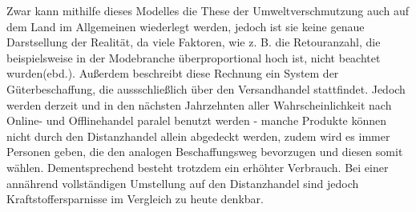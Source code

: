 \begin{folding}
\begin{itemize}
\end{itemize}
Zwar kann mithilfe dieses Modelles die These der Umweltverschmutzung auch auf dem Land im Allgemeinen wiederlegt werden, jedoch ist sie keine genaue Darstsellung der Realität, da viele Faktoren, wie z. B. die Retouranzahl, die beispielsweise in der Modebranche überproportional hoch ist, nicht beachtet wurden(ebd.). Außerdem beschreibt diese Rechnung ein System der Güterbeschaffung, die aussschließlich über den Versandhandel stattfindet. Jedoch werden derzeit und in den nächsten Jahrzehnten aller Wahrscheinlichkeit nach Online- und Offlinehandel paralel benutzt werden - manche Produkte können nicht durch den Distanzhandel allein abgedeckt werden, zudem wird es immer Personen geben, die den analogen Beschaffungsweg bevorzugen und diesen somit wählen. Dementsprechend besteht trotzdem ein erhöhter Verbrauch. Bei einer annährend vollständigen Umstellung auf den Distanzhandel  sind jedoch Kraftstoffersparnisse im Vergleich zu heute denkbar.

\end{folding}

